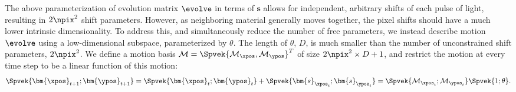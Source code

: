 


The above parameterization of evolution matrix $\evolve$ in terms of $\bm{s}$ allows for independent, arbitrary shifts of each pulse of light, resulting in $2 \npix^2$ shift parameters. However, as neighboring material generally moves together, the pixel shifts should have a much lower intrinsic dimensionality. 
To address this, and simultaneously reduce the number of free parameters, we instead describe motion $\evolve$ using a low-dimensional subspace, parameterized by $\theta$. The length of $\theta$, $D$, is much smaller than the number of unconstrained shift parameters, $2 \npix^2$. %
We define a motion basis $\mathcal{M} = \Spvek{\mathcal{M}_{\xpos}, \mathcal{M}_\ypos}^T$ of size $2\npix^2 \times D+1$, and restrict the motion at every time step to be a linear function of this motion:
\begin{align}
\Spvek{\bm{\xpos}_{t+1}; \bm{\ypos}_{t+1}} = \Spvek{\bm{\xpos}_t; \bm{\ypos}_t} + \Spvek{\bm{s}_{\xpos_t}; \bm{s}_{\ypos_t}} =  \Spvek{\mathcal{M}_{\xpos_t}; \mathcal{M}_{\ypos_t}} \Spvek{1; \theta} .
\end{align}

